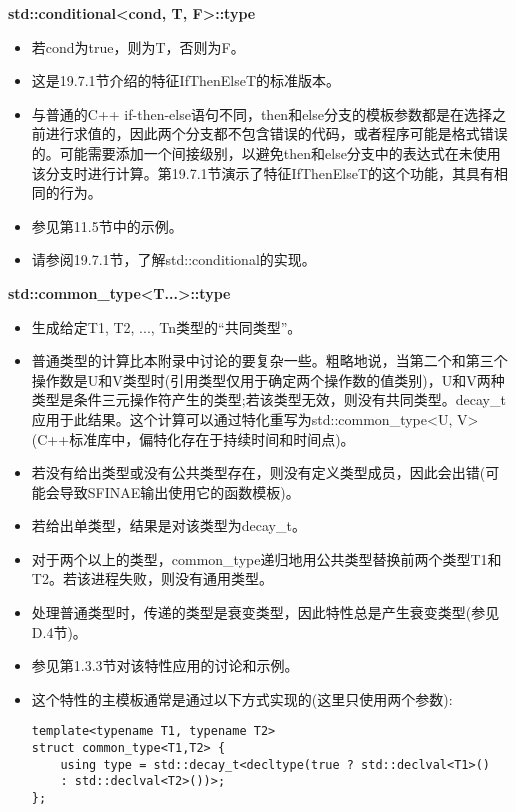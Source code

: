 \textbf{std::conditional<cond, T, F>::type}

\begin{itemize}
\item
若cond为true，则为T，否则为F。

\item
这是19.7.1节介绍的特征IfThenElseT的标准版本。

\item
与普通的C++ if-then-else语句不同，then和else分支的模板参数都是在选择之前进行求值的，因此两个分支都不包含错误的代码，或者程序可能是格式错误的。可能需要添加一个间接级别，以避免then和else分支中的表达式在未使用该分支时进行计算。第19.7.1节演示了特征IfThenElseT的这个功能，其具有相同的行为。

\item
参见第11.5节中的示例。

\item
请参阅19.7.1节，了解std::conditional的实现。
\end{itemize}

\textbf{std::common\_type<T...>::type}

\begin{itemize}
\item
生成给定T1, T2, ..., Tn类型的“共同类型”。

\item
普通类型的计算比本附录中讨论的要复杂一些。粗略地说，当第二个和第三个操作数是U和V类型时(引用类型仅用于确定两个操作数的值类别)，U和V两种类型是条件三元操作符产生的类型;若该类型无效，则没有共同类型。decay\_t应用于此结果。这个计算可以通过特化重写为std::common\_type<U, V>(C++标准库中，偏特化存在于持续时间和时间点)。

\item
若没有给出类型或没有公共类型存在，则没有定义类型成员，因此会出错(可能会导致SFINAE输出使用它的函数模板)。

\item
若给出单类型，结果是对该类型为decay\_t。

\item
对于两个以上的类型，common\_type递归地用公共类型替换前两个类型T1和T2。若该进程失败，则没有通用类型。

\item
处理普通类型时，传递的类型是衰变类型，因此特性总是产生衰变类型(参见D.4节)。

\item
参见第1.3.3节对该特性应用的讨论和示例。

\item
这个特性的主模板通常是通过以下方式实现的(这里只使用两个参数):

\begin{lstlisting}[style=styleCXX]
template<typename T1, typename T2>
struct common_type<T1,T2> {
	using type = std::decay_t<decltype(true ? std::declval<T1>()
	: std::declval<T2>())>;
};
\end{lstlisting}
\end{itemize}

